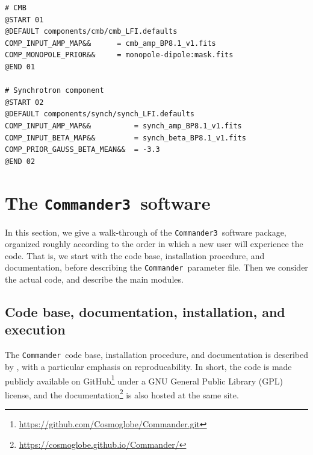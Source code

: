 \documentclass[twocolumn]{aa}
\def\commander{\texttt{Commander}}
\def\commanderthree{\texttt{Commander3}}
\begin{document}
\begin{lstfloat}[t]
{\begin{tcolorbox}
\begin{lstlisting}
# CMB
@START 01
@DEFAULT components/cmb/cmb_LFI.defaults
COMP_INPUT_AMP_MAP&&      = cmb_amp_BP8.1_v1.fits
COMP_MONOPOLE_PRIOR&&     = monopole-dipole:mask.fits
@END 01

# Synchrotron component
@START 02
@DEFAULT components/synch/synch_LFI.defaults
COMP_INPUT_AMP_MAP&&          = synch_amp_BP8.1_v1.fits
COMP_INPUT_BETA_MAP&&         = synch_beta_BP8.1_v1.fits
COMP_PRIOR_GAUSS_BETA_MEAN&&  = -3.3
@END 02
\end{lstlisting}
    \end{tcolorbox}
}
\caption{Prototype \commander\ parameter file.}\label{listing:param}
\end{lstfloat}


\section{The \commanderthree\ software}
\label{sec:commander3}

In this section, we give a walk-through of the
\commanderthree\ software package, organized roughly according to the
order in which a new user will experience the code. That is, we start
with the code base, installation procedure, and documentation, before
describing the \commander\ parameter file. Then we consider the actual
code, and describe the main modules. 

\subsection{Code base, documentation, installation, and execution}

The \commander\ code base, installation procedure, and documentation
is described by \citet{BP05}, with a particular emphasis on
reproducability. In short, the code is made publicly available on
GitHub\footnote{\url{https://github.com/Cosmoglobe/Commander.git}}
under a GNU General Public Library (GPL) license, and the
documentation\footnote{\url{https://cosmoglobe.github.io/Commander/}}
is also hosted at the same site.
\end{document}
